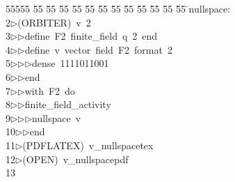 %
%
\begin{tabbing}
55555 \= 55 \= 55 \= 55 \= 55 \= 55 \= 55 \= 55 \= 55 \= 55 \= 55 \= 55 \= 55 \= \>nullspace:\\[0pt]
2\>$\triangleright$\>(ORBITER)\ v\ 2\ \\[0pt]
3\>$\triangleright$\>$\triangleright$\>define\ F2\ finite\_field\ q\ 2\ end\ \\[0pt]
4\>$\triangleright$\>$\triangleright$\>define\ v\ vector\ field\ F2\ format\ 2\ \\[0pt]
5\>$\triangleright$\>$\triangleright$\>$\triangleright$\>dense\ 1111011001\ \\[0pt]
6\>$\triangleright$\>$\triangleright$\>end\ \\[0pt]
7\>$\triangleright$\>$\triangleright$\>with\ F2\ do\ \\[0pt]
8\>$\triangleright$\>$\triangleright$\>finite\_field\_activity\ \\[0pt]
9\>$\triangleright$\>$\triangleright$\>$\triangleright$\>nullspace\ v\ \\[0pt]
10\>$\triangleright$\>$\triangleright$\>end\\[0pt]
11\>$\triangleright$\>(PDFLATEX)\ v\_nullspacetex\\[0pt]
12\>$\triangleright$\>(OPEN)\ v\_nullspacepdf\\[0pt]
13\>\end{tabbing}
